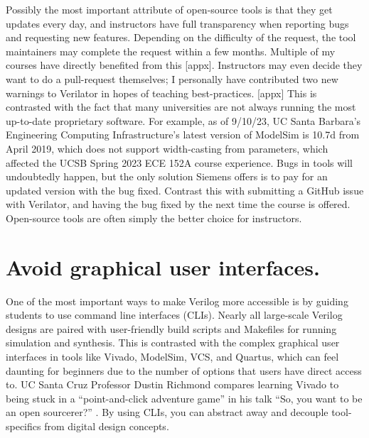 Possibly the most important attribute of open-source tools is that they get updates every day, and instructors have full transparency when reporting bugs and requesting new features. Depending on the difficulty of the request, the tool maintainers may complete the request within a few months. Multiple of my courses have directly benefited from this [appx]. Instructors may even decide they want to do a pull-request themselves; I personally have contributed two new warnings to Verilator in hopes of teaching best-practices. [appx] This is contrasted with the fact that many universities are not always running the most up-to-date proprietary software. For example, as of 9/10/23, UC Santa Barbara's Engineering Computing Infrastructure's latest version of ModelSim is 10.7d from April 2019, which does not support width-casting from parameters, which affected the UCSB Spring 2023 ECE 152A course experience. Bugs in tools will undoubtedly happen, but the only solution Siemens offers is to pay for an updated version with the bug fixed. Contrast this with submitting a GitHub issue with Verilator, and having the bug fixed by the next time the course is offered. Open-source tools are often simply the better choice for instructors.

\section{Avoid graphical user interfaces.}

One of the most important ways to make Verilog more accessible is by guiding students to use command line interfaces (CLIs). Nearly all large-scale Verilog designs are paired with user-friendly build scripts and Makefiles for running simulation and synthesis. This is contrasted with the complex graphical user interfaces in tools like Vivado, ModelSim, VCS, and Quartus, which can feel daunting for beginners due to the number of options that users have direct access to. UC Santa Cruz Professor Dustin Richmond compares learning Vivado to being stuck in a ``point-and-click adventure game'' in his talk ``So, you want to be an open sourcerer?'' \cite{RichmondLatchUp}. By using CLIs, you can abstract away and decouple tool-specifics from digital design concepts.

